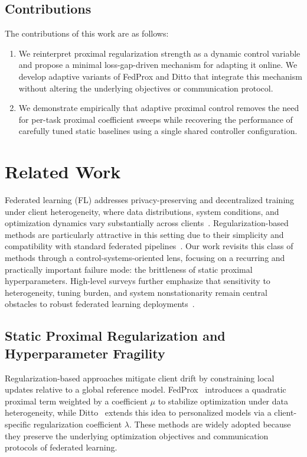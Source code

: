 \documentclass[letterpaper]{article} %
\begin{document}
\subsection*{Contributions}

The contributions of this work are as follows:
\begin{enumerate}
    \item We reinterpret proximal regularization strength as a dynamic control variable and propose a minimal loss-gap-driven mechanism for adapting it online. We develop adaptive variants of FedProx and Ditto that integrate this mechanism without altering the underlying objectives or communication protocol.
    \item We demonstrate empirically that adaptive proximal control removes the need for per-task proximal coefficient sweeps while recovering the performance of carefully tuned static baselines using a single shared controller configuration.
\end{enumerate}

\section{Related Work}

Federated learning (FL) addresses privacy-preserving and decentralized training under client heterogeneity, where data distributions, system conditions, and optimization dynamics vary substantially across clients~\cite{mcmahan2017communication}. Regularization-based methods are particularly attractive in this setting due to their simplicity and compatibility with standard federated pipelines~\cite{li2020federated, li2021ditto}. Our work revisits this class of methods through a control-systems-oriented lens, focusing on a recurring and practically important failure mode: the brittleness of static proximal hyperparameters. High-level surveys further emphasize that sensitivity to heterogeneity, tuning burden, and system nonstationarity remain central obstacles to robust federated learning deployments~\cite{wen2023survey}.

\subsection{Static Proximal Regularization and Hyperparameter Fragility}

Regularization-based approaches mitigate client drift by constraining local updates relative to a global reference model. FedProx~\cite{li2020federated} introduces a quadratic proximal term weighted by a coefficient $\mu$ to stabilize optimization under data heterogeneity, while Ditto~\cite{li2021ditto} extends this idea to personalized models via a client-specific regularization coefficient $\lambda$. These methods are widely adopted because they preserve the underlying optimization objectives and communication protocols of federated learning.
\end{document}
